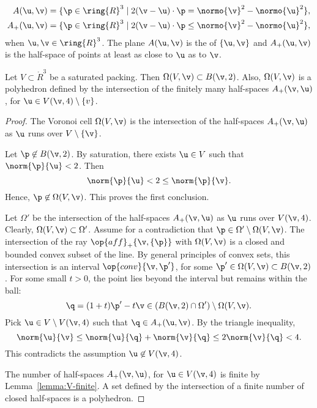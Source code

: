 \begin{definition}[bisector]
\begin{eqnarray*} 
A(\u,\v) &= \{\p\in\ring{R}^3
\mid 2(\v-\u)\cdot \p = \normo{\v}^2 - \normo{\u}^2 \},\\
A_+(\u,\v) &= \{\p\in\ring{R}^3
\mid 2(\v-\u)\cdot \p \le \normo{\v}^2 - \normo{\u}^2 \},
\end{eqnarray*}
when $\u,\v\in\ring{R}^3$.  The plane $A(\u,\v)$ is the  of
$\{\u,\v\}$ and $A_+(\u,\v)$ is the half-space of points at least as
close to $\u$ as to $\v$.  
\end{definition}

\begin{lemma}[]\label{lemma:V4} 
  Let $V\subset\ring{R}^3$ be a saturated packing.  Then
  $\Omega(V,\v)\subset B(\v,2)$.  Also, $\Omega(V,\v)$ is a polyhedron
  defined by the intersection of the finitely many half-spaces
  $A_+(\v,\u)$, for $\u\in V(\v,4)\setminus\{v\}$.
\end{lemma}

\begin{proof} 
The Voronoi cell $\Omega(V,\v)$ is the
intersection of the half-spaces $A_+(\v,\u)$ as $\u$ runs over
$V\setminus \{\v\}$.

Let $\p\not\in B(\v,2)$.  
By saturation, there exists $\u\in V$ such that $\norm{\p}{\u}<2$.
Then 
\begin{displaymath} 
\norm{\p}{\u} < 2 \le \norm{\p}{\v}.
\end{displaymath}
Hence, $\p\not\in\Omega(V,\v)$.  This proves the first conclusion.


Let $\Omega'$ be the intersection of the half-spaces $A_+(\v,\u)$ as
$\u$ runs over $V(\v,4)$.  Clearly, $\Omega(V,\v)\subset \Omega'$.
Assume for a contradiction that $\p\in \Omega'\setminus\Omega(V,\v)$.
The intersection of the ray $\op{aff}_+\{\v,\{\p\}\}$ with
$\Omega(V,\v)$ is a closed and bounded convex subset of the line.  By
general principles of convex sets, this intersection is an interval
$\op{conv}\{\v,\p'\}$, for some $\p'\in\Omega(V,\v)\subset B(\v,2)$.
For some small $t>0$, the point lies beyond the interval but remains
within the ball:
\begin{displaymath} 
\q = (1+t)\p' -t \v\in (B(\v,2)\cap \Omega')\setminus \Omega(V,\v).
\end{displaymath}
Pick $\u\in V\setminus V(\v,4)$ such that $\q\in A_+(\u,\v)$.  By the
triangle inequality,
\begin{displaymath} 
\norm{\u}{\v} \le \norm{\u}{\q} + \norm{\v}{\q} \le 2\norm{\v}{\q} < 4.
\end{displaymath}
This contradicts the assumption $\u\not\in V(\v,4)$.

The number of half-spaces $A_+(\v,\u)$, for $\u\in V(\v,4)$ is finite by
Lemma~\ref{lemma:V-finite}.  A set defined by the intersection of a finite number
of closed half-spaces is a polyhedron.
\end{proof}

